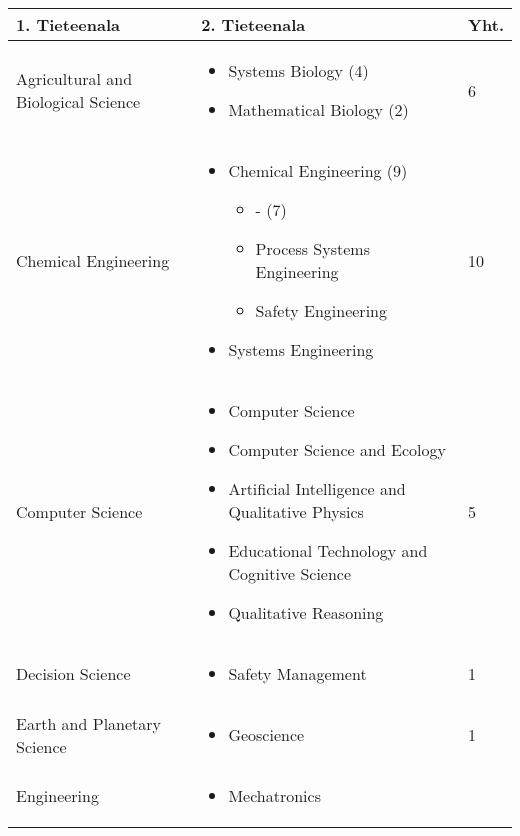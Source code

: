 \documentclass[utf8]{gradu3}
\begin{document}
\begin{longtable}[h]{|p{5cm}|p{8cm}|p{1cm}|}
    \hline
    \textbf{1. Tieteenala}    & \textbf{2. Tieteenala} & \textbf{Yht.} \\
    \hline
    Agricultural and Biological Science  & \begin{itemize}
        \item Systems Biology (4)
        \item Mathematical Biology (2)
    \end{itemize} & 6 \\
    \hline
    Chemical Engineering & \begin{itemize}
        \item Chemical Engineering (9)
        \begin{itemize}
            \item - (7)
            \item Process Systems Engineering
            \item Safety Engineering
        \end{itemize}
        \item Systems Engineering
    \end{itemize} & 10 \\
    \hline
    Computer Science & \begin{itemize}
        \item Computer Science
        \item Computer Science and Ecology
        \item Artificial Intelligence and Qualitative Physics
        \item Educational Technology and Cognitive Science
        \item Qualitative Reasoning
    \end{itemize} & 5 \\
    \hline
    Decision Science & \begin{itemize}
        \item Safety Management
    \end{itemize} & 1 \\
    \hline
    Earth and Planetary Science & \begin{itemize}
        \item Geoscience
    \end{itemize} & 1 \\
    \hline
    Engineering & \begin{itemize}
        \item Mechatronics

\end{itemize}
\end{longtable}
\end{document}
